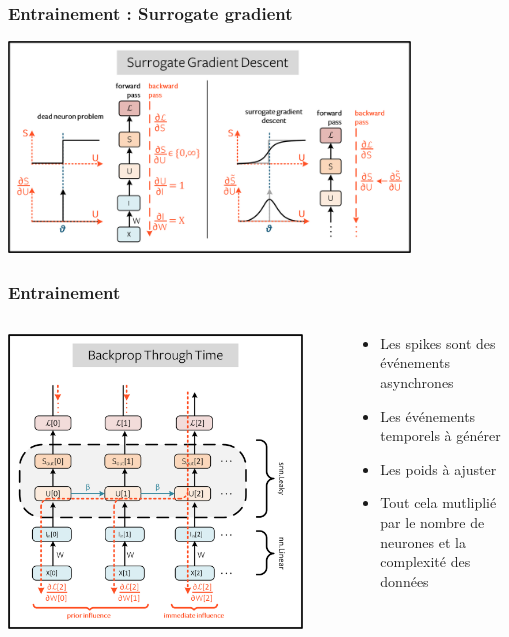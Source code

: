 \documentclass[aspectratio=169]{beamer}
\begin{document}
\begin{frame}
  \frametitle{Entrainement : Surrogate gradient}

  \begin{center}
    \includegraphics[width=0.8\textwidth]{image/surrogate.png}
  \end{center}
\end{frame}

\begin{frame}
  \frametitle{Entrainement}
  \begin{columns}
    \begin{column}{0.5\textwidth}
      \begin{center}
        \includegraphics[width=0.9\textwidth]{image/bptt.png}
      \end{center}
    \end{column}
    \begin{column}{0.5\textwidth}
      \begin{itemize}
        \item Les spikes sont des événements asynchrones
        \item Les événements temporels à générer
        \item Les poids à ajuster
        \item Tout cela mutliplié par le nombre de neurones et la complexité des données
      \end{itemize}
    \end{column}
  \end{columns}

\end{frame}
\end{document}
